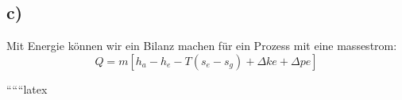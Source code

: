 

\subsection*{c)}
Mit Energie können wir ein Bilanz machen für ein Prozess mit eine massestrom:
\[
Q = m \left[ h_a - h_e - T \left( s_e - s_g \right) + \Delta k e + \Delta p e \right]
\]

``````latex
